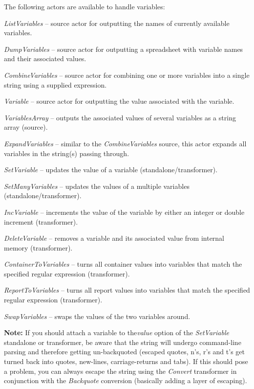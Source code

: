 The following actors are available to handle variables:
\begin{tight_itemize}
	\item \textit{ListVariables} -- source actor for outputting the names of 
	currently available variables.
	\item \textit{DumpVariables} -- source actor for outputting a spreadsheet with
	variable names and their associated values.
	\item \textit{CombineVariables} -- source actor for combining one or more
	variables into a single string using a supplied expression.
	\item \textit{Variable} -- source actor for outputting the value associated
	with the variable.
	\item \textit{VariablesArray} -- outputs the associated values of several
	variables as a string array (source).
	\item \textit{ExpandVariables} -- similar to the \textit{CombineVariables}
	source, this actor expands all variables in the string(s) passing through.
	\item \textit{SetVariable} -- updates the value of a variable (standalone/transformer).
	\item \textit{SetManyVariables} -- updates the values of a multiple variables (standalone/transformer).
	\item \textit{IncVariable} -- increments the value of the variable by either an
	integer or double increment (transformer).
	\item \textit{DeleteVariable} -- removes a variable and its associated value
	from internal memory (transformer).
	\item \textit{ContainerToVariables} -- turns all container values into variables
	that match the specified regular expression (transformer).
	\item \textit{ReportToVariables} -- turns all report values into variables
	that match the specified regular expression (transformer).
	\item \textit{SwapVariables} -- swaps the values of the two variables
	around.
\end{tight_itemize}

\noindent \textbf{Note:} If you should attach a variable to the\textit{value}
option of the \textit{SetVariable} standalone or transformer, be aware that
the string will undergo command-line parsing and therefore getting un-backquoted
(escaped quotes, n's, r's and t's get turned back into quotes, new-lines,
carriage-returns and tabs). If this should pose a problem, you can always
escape the string using the \textit{Convert} transformer in conjunction with
the \textit{Backquote} conversion (basically adding a layer of escaping).

